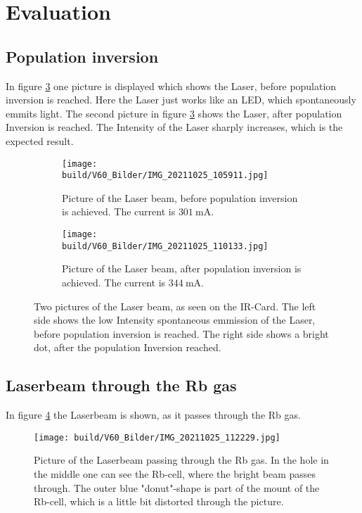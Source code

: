 \section{Evaluation}
\subsection{ Population inversion}
In figure \ref{fig:population} one picture is displayed which shows the Laser, before population inversion is reached. Here the Laser just works like an LED, which spontaneously emmits light. 
The second picture in figure \ref{fig:population} shows the Laser, after population Inversion is reached. The Intensity of the Laser sharply increases, which is the expected result.
\begin{figure}
    \centering
    \begin{subfigure}{.5\textwidth}
      \centering
      \texttt{[image: build/V60\_Bilder/IMG\_20211025\_105911.jpg]}
      \caption{Picture of the Laser beam, before population inversion is achieved. The current is $\SI{301}{\milli\ampere}$.}
      \label{fig:su1}
    \end{subfigure}%
    \begin{subfigure}{.5\textwidth}
      \centering
      \texttt{[image: build/V60\_Bilder/IMG\_20211025\_110133.jpg]}
      \caption{Picture of the Laser beam, after population inversion is achieved. The current is $\SI{344}{\milli\ampere}$.}
      \label{fig:su2}
    \end{subfigure}
    \caption{Two pictures of the Laser beam, as seen on the IR-Card. The left side shows the low Intensity spontaneous emmission of the Laser, before population inversion is reached. The right side shows a bright dot, after the population Inversion reached.}
    \label{fig:population}
    \end{figure}

\subsection{ Laserbeam through the Rb gas}
In figure \ref{fig:beam} the Laserbeam is shown, as it passes through the Rb gas. 
\begin{figure}
    \centering
    \texttt{[image: build/V60\_Bilder/IMG\_20211025\_112229.jpg]}
    \caption{Picture of the Laserbeam passing through the Rb gas. In the hole in the middle one can see the Rb-cell, where the bright beam passes through. The outer blue "donut"-shape is part of the mount of the Rb-cell, which is a little bit distorted through the picture. }
    \label{fig:beam}
\end{figure}

